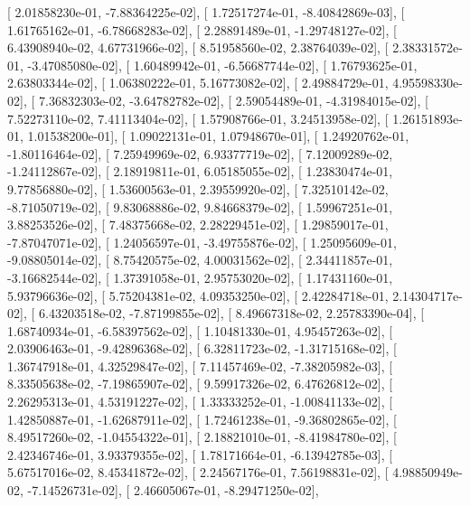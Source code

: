 \documentclass{article}
\begin{document}
       [  2.01858230e-01,  -7.88364225e-02],
       [  1.72517274e-01,  -8.40842869e-03],
       [  1.61765162e-01,  -6.78668283e-02],
       [  2.28891489e-01,  -1.29748127e-02],
       [  6.43908940e-02,   4.67731966e-02],
       [  8.51958560e-02,   2.38764039e-02],
       [  2.38331572e-01,  -3.47085080e-02],
       [  1.60489942e-01,  -6.56687744e-02],
       [  1.76793625e-01,   2.63803344e-02],
       [  1.06380222e-01,   5.16773082e-02],
       [  2.49884729e-01,   4.95598330e-02],
       [  7.36832303e-02,  -3.64782782e-02],
       [  2.59054489e-01,  -4.31984015e-02],
       [  7.52273110e-02,   7.41113404e-02],
       [  1.57908766e-01,   3.24513958e-02],
       [  1.26151893e-01,   1.01538200e-01],
       [  1.09022131e-01,   1.07948670e-01],
       [  1.24920762e-01,  -1.80116464e-02],
       [  7.25949969e-02,   6.93377719e-02],
       [  7.12009289e-02,  -1.24112867e-02],
       [  2.18919811e-01,   6.05185055e-02],
       [  1.23830474e-01,   9.77856880e-02],
       [  1.53600563e-01,   2.39559920e-02],
       [  7.32510142e-02,  -8.71050719e-02],
       [  9.83068886e-02,   9.84668379e-02],
       [  1.59967251e-01,   3.88253526e-02],
       [  7.48375668e-02,   2.28229451e-02],
       [  1.29859017e-01,  -7.87047071e-02],
       [  1.24056597e-01,  -3.49755876e-02],
       [  1.25095609e-01,  -9.08805014e-02],
       [  8.75420575e-02,   4.00031562e-02],
       [  2.34411857e-01,  -3.16682544e-02],
       [  1.37391058e-01,   2.95753020e-02],
       [  1.17431160e-01,   5.93796636e-02],
       [  5.75204381e-02,   4.09353250e-02],
       [  2.42284718e-01,   2.14304717e-02],
       [  6.43203518e-02,  -7.87199855e-02],
       [  8.49667318e-02,   2.25783390e-04],
       [  1.68740934e-01,  -6.58397562e-02],
       [  1.10481330e-01,   4.95457263e-02],
       [  2.03906463e-01,  -9.42896368e-02],
       [  6.32811723e-02,  -1.31715168e-02],
       [  1.36747918e-01,   4.32529847e-02],
       [  7.11457469e-02,  -7.38205982e-03],
       [  8.33505638e-02,  -7.19865907e-02],
       [  9.59917326e-02,   6.47626812e-02],
       [  2.26295313e-01,   4.53191227e-02],
       [  1.33333252e-01,  -1.00841133e-02],
       [  1.42850887e-01,  -1.62687911e-02],
       [  1.72461238e-01,  -9.36802865e-02],
       [  8.49517260e-02,  -1.04554322e-01],
       [  2.18821010e-01,  -8.41984780e-02],
       [  2.42346746e-01,   3.93379355e-02],
       [  1.78171664e-01,  -6.13942785e-03],
       [  5.67517016e-02,   8.45341872e-02],
       [  2.24567176e-01,   7.56198831e-02],
       [  4.98850949e-02,  -7.14526731e-02],
       [  2.46605067e-01,  -8.29471250e-02],
\end{document}
